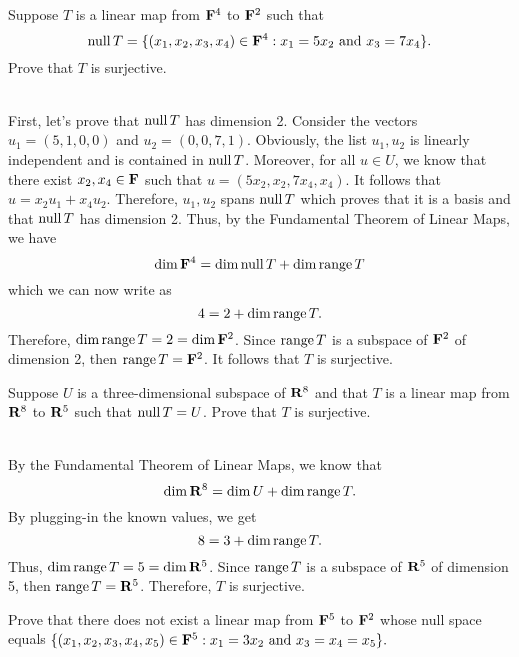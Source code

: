 \begin{exercise}
    Suppose $T$ is a linear map from $\mathbf{F}^4$ to $\mathbf{F}^2$ such that
    $$\operatorname{\text{null}} T = \{(x_1, x_2, x_3, x_4) \in \mathbf{F}^4 : x_1 = 5x_2 \text{ and } x_3 = 7x_4 \}.$$
    Prove that $T$ is surjective. \\
\end{exercise}

\begin{solution}
    \\ First, let's prove that $\operatorname{\text{null}} T$ has dimension 2. Consider the vectors $u_1 = (5, 1, 0, 0)$ and $u_2 = (0, 0, 7, 1)$. Obviously, the list $u_1, u_2$ is linearly independent and is contained in $\operatorname{\text{null}} T$. Moreover, for all $u \in U$, we know that there exist $x_2, x_4 \in \mathbf{F}$ such that $u = (5x_2, x_2, 7x_4, x_4)$. It follows that $u = x_2 u_1 + x_4 u_2$. Therefore, $u_1, u_2$ spans $\operatorname{\text{null}} T$ which proves that it is a basis and that $\operatorname{\text{null}} T$ has dimension 2. Thus, by the Fundamental Theorem of Linear Maps, we have
    $$\dim \mathbf{F}^4 = \dim \operatorname{\text{null}} T + \dim \operatorname{\text{range}} T$$
    which we can now write as
    $$4 = 2 + \dim \operatorname{\text{range}} T.$$
    Therefore, $\dim \operatorname{\text{range}} T = 2 = \dim \mathbf{F}^2$. Since $\operatorname{\text{range}} T$ is a subspace of $\mathbf{F}^2$ of dimension 2, then $\operatorname{\text{range}} T = \mathbf{F}^2$. It follows that $T$ is surjective. \\
\end{solution}

\begin{exercise}
    Suppose $U$ is a three-dimensional subspace of $\mathbf{R}^8$ and that $T$ is a linear map from $\mathbf{R}^8$ to $\mathbf{R}^5$ such that $\operatorname{\text{null}} T = U$. Prove that $T$ is surjective. \\
\end{exercise}

\begin{solution}
    \\ By the Fundamental Theorem of Linear Maps, we know that
    $$\dim \mathbf{R}^8 = \dim U + \dim \operatorname{\text{range}} T.$$
    By plugging-in the known values, we get 
    $$8 = 3 + \dim \operatorname{\text{range}} T.$$
    Thus, $\dim \operatorname{\text{range}} T = 5 = \dim \mathbf{R}^5$. Since $\operatorname{\text{range}} T$ is a subspace of $\mathbf{R}^5$ of dimension 5, then $\operatorname{\text{range}} T = \mathbf{R}^5$. Therefore, $T$ is surjective. \\
\end{solution}

\begin{exercise}
    Prove that there does not exist a linear map from $\mathbf{F}^5$ to $\mathbf{F}^2$ whose null space equals $\{(x_1, x_2, x_3, x_4, x_5) \in \mathbf{F}^5 : x_1 = 3x_2 \text{ and } x_3 = x_4 = x_5\}.$ \\
\end{exercise}

